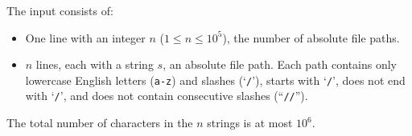 
    The input consists of:
    \begin{itemize}
        \item One line with an integer $n$ ($1\leq n\leq 10^5$), the number of
    absolute file paths.
        \item $n$ lines, each with a string $s$, an absolute file path. Each path
    contains only lowercase English letters (\texttt{a-z}) and slashes
    (`\texttt{/}'), starts with `\texttt{/}', does not end with `\texttt{/}', and does not
    contain consecutive slashes (``\texttt{//}'').
    \end{itemize}
    The total number of characters in the $n$ strings is at most $10^6$.
